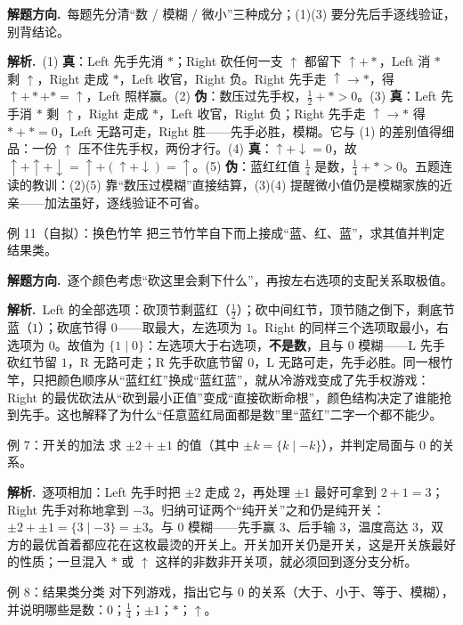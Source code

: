 \documentclass[UTF8,a4paper,11pt,oneside,openany,fontset=fandol]{ctexbook}
\theoremstyle{definition}
\newcommand{\sol}{\par\noindent\textbf{解析.}\ }
\newcommand{\hint}{\par\noindent\textbf{解题方向.}\ }
\begin{document}
\hint 每题先分清“数 / 模糊 / 微小”三种成分；(1)(3) 要分先后手逐线验证，别背结论。

\sol (1) \textbf{真}：Left 先手先消 $\ast$；Right 砍任何一支 $\uparrow$ 都留下 $\uparrow+\ast$，Left 消 $\ast$ 剩 $\uparrow$，Right 走成 $\ast$，Left 收官，Right 负。Right 先手走 $\uparrow\to\ast$，得 $\uparrow+\ast+\ast=\uparrow$，Left 照样赢。(2) \textbf{伪}：数压过先手权，$\tfrac12+\ast>0$。(3) \textbf{真}：Left 先手消 $\ast$ 剩 $\uparrow$，Right 走成 $\ast$，Left 收官，Right 负；Right 先手走 $\uparrow\to\ast$ 得 $\ast+\ast=0$，Left 无路可走，Right 胜——先手必胜，模糊。它与 (1) 的差别值得细品：一份 $\uparrow$ 压不住先手权，两份才行。(4) \textbf{真}：$\uparrow+\downarrow=0$，故 $\uparrow+\uparrow+\downarrow=\uparrow+(\uparrow+\downarrow)=\uparrow$。(5) \textbf{伪}：蓝红红值 $\tfrac14$ 是数，$\tfrac14+\ast>0$。五题连读的教训：(2)(5) 靠“数压过模糊”直接结算，(3)(4) 提醒微小值仍是模糊家族的近亲——加法虽好，逐线验证不可省。

\begin{problem}{例 11（自拟）：换色竹竿}
把三节竹竿自下而上接成“蓝、红、蓝”，求其值并判定结果类。
\end{problem}

\hint 逐个颜色考虑“砍这里会剩下什么”，再按左右选项的支配关系取极值。

\sol Left 的全部选项：砍顶节剩蓝红（$\tfrac12$）；砍中间红节，顶节随之倒下，剩底节蓝（$1$）；砍底节得 $0$——取最大，左选项为 $1$。Right 的同样三个选项取最小，右选项为 $0$。故值为 $\{1\mid 0\}$：左选项大于右选项，\textbf{不是数}，且与 $0$ 模糊——L 先手砍红节留 $1$，R 无路可走；R 先手砍底节留 $0$，L 无路可走，先手必胜。同一根竹竿，只把颜色顺序从“蓝红红”换成“蓝红蓝”，就从冷游戏变成了先手权游戏：Right 的最优砍法从“砍到最小正值”变成“直接砍断命根”，颜色结构决定了谁能抢到先手。这也解释了为什么“任意蓝红局面都是数”里“蓝红”二字一个都不能少。

\begin{problem}{例 7：开关的加法}
求 $\pm2+\pm1$ 的值（其中 $\pm k=\{k\mid -k\}$），并判定局面与 $0$ 的关系。
\end{problem}

\sol 逐项相加：Left 先手时把 $\pm2$ 走成 $2$，再处理 $\pm1$ 最好可拿到 $2+1=3$；Right 先手对称地拿到 $-3$。归纳可证两个“纯开关”之和仍是纯开关：$\pm2+\pm1=\{3\mid -3\}=\pm3$。与 $0$ 模糊——先手赢 $3$、后手输 $3$，温度高达 $3$，双方的最优首着都应花在这枚最烫的开关上。开关加开关仍是开关，这是开关族最好的性质；一旦混入 $\ast$ 或 $\uparrow$ 这样的非数非开关项，就必须回到逐分支分析。

\begin{problem}{例 8：结果类分类}
对下列游戏，指出它与 $0$ 的关系（大于、小于、等于、模糊），并说明哪些是数：$0$；$\tfrac14$；$\pm1$；$\ast$；$\uparrow$。
\end{problem}
\end{document}
